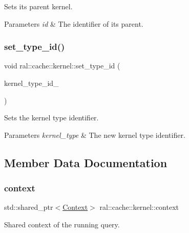 Sets its parent kernel. 


\begin{DoxyParams}{Parameters}
{\em id} & The identifier of its parent. \\
\hline
\end{DoxyParams}
\mbox{\label{classral_1_1cache_1_1kernel_ae4a8519fe026454fe5385122c1e02615}} 
\subsubsection{\texorpdfstring{set\+\_\+type\+\_\+id()}{set\_type\_id()}}
{\footnotesize\ttfamily void ral\+::cache\+::kernel\+::set\+\_\+type\+\_\+id (\begin{DoxyParamCaption}\item[{kernel\+\_\+type}]{kernel\+\_\+type\+\_\+id\+\_\+ }\end{DoxyParamCaption})\hspace{0.3cm}{\ttfamily [inline]}}



Sets the kernel type identifier. 


\begin{DoxyParams}{Parameters}
{\em kernel\+\_\+type} & The new kernel type identifier. \\
\hline
\end{DoxyParams}


\subsection{Member Data Documentation}
\mbox{\label{classral_1_1cache_1_1kernel_af0347d14d678cfa7205c1387746a2e1b}} 
\subsubsection{\texorpdfstring{context}{context}}
{\footnotesize\ttfamily std\+::shared\+\_\+ptr$<$\hyperlink{classblazingdb_1_1manager_1_1Context}{Context}$>$ ral\+::cache\+::kernel\+::context}

Shared context of the running query. \mbox{\label{classral_1_1cache_1_1kernel_a8ac24c565e0d29b390d40e7ef3366486}} 
